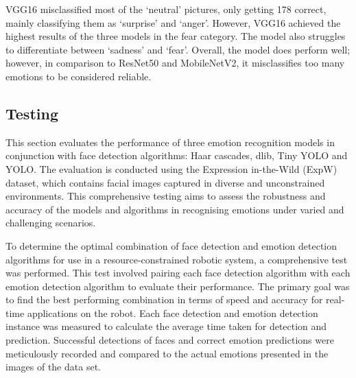 VGG16 misclassified most of the `neutral' pictures, only getting 178 correct, mainly classifying them as `surprise' and `anger'. However, VGG16 achieved the highest results of the three models in the fear category. The model also struggles to differentiate between `sadness' and `fear'. Overall, the model does perform well; however, in comparison to ResNet50 and MobileNetV2, it misclassifies too many emotions to be considered reliable.

\subsection{Testing}

This section evaluates the performance of three emotion recognition models in conjunction with face detection algorithms: Haar cascades, dlib, Tiny YOLO and YOLO. The evaluation is conducted using the Expression in-the-Wild (ExpW) dataset, which contains facial images captured in diverse and unconstrained environments. This comprehensive testing aims to assess the robustness and accuracy of the models and algorithms in recognising emotions under varied and challenging scenarios.

To determine the optimal combination of face detection and emotion detection algorithms for use in a resource-constrained robotic system, a comprehensive test was performed. This test involved pairing each face detection algorithm with each emotion detection algorithm to evaluate their performance. The primary goal was to find the best performing combination in terms of speed and accuracy for real-time applications on the robot. Each face detection and emotion detection instance was measured to calculate the average time taken for detection and prediction. Successful detections of faces and correct emotion predictions were meticulously recorded and compared to the actual emotions presented in the images of the data set.

